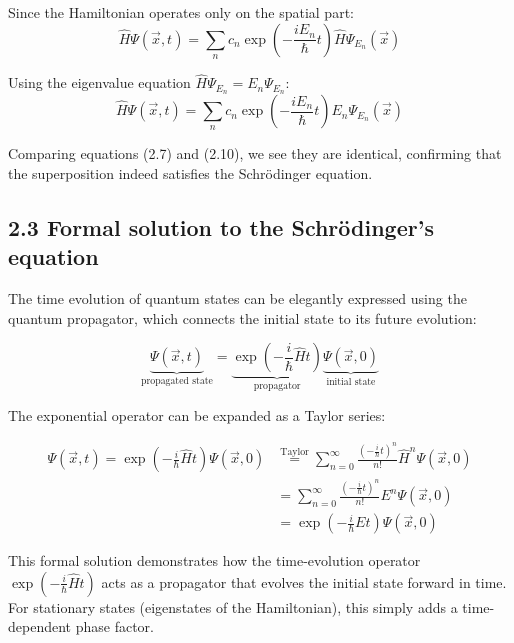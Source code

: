 \documentclass[10pt]{article}
\begin{document}
Since the Hamiltonian operates only on the spatial part:
\begin{equation*}
\hat{H}\Psi(\vec{x},t) = \sum_n c_n\exp\left(-\frac{iE_n}{\hbar}t\right)\hat{H}\Psi_{E_n}(\vec{x}) \tag{2.9}
\end{equation*}

Using the eigenvalue equation $\hat{H}\Psi_{E_n} = E_n\Psi_{E_n}$:
\begin{equation*}
\hat{H}\Psi(\vec{x},t) = \sum_n c_n\exp\left(-\frac{iE_n}{\hbar}t\right)E_n\Psi_{E_n}(\vec{x}) \tag{2.10}
\end{equation*}

Comparing equations (2.7) and (2.10), we see they are identical, confirming that the superposition indeed satisfies the Schrödinger equation.

\subsection*{2.3 Formal solution to the Schrödinger's equation}

The time evolution of quantum states can be elegantly expressed using the quantum propagator, which connects the initial state to its future evolution:

\begin{equation*}
\underbrace{\Psi(\vec{x},t)}_{\text{propagated state}} = \underbrace{\exp\left(-\frac{i}{\hbar}\hat{H}t\right)}_{\text{propagator}}\underbrace{\Psi(\vec{x},0)}_{\text{initial state}} \tag{2.11}
\end{equation*}

The exponential operator can be expanded as a Taylor series:

\begin{align*}
\Psi(\vec{x},t) = \exp\left(-\frac{i}{\hbar}\hat{H}t\right)\Psi(\vec{x},0) &\stackrel{\text{Taylor}}{=} \sum_{n=0}^{\infty}\frac{\left(-\frac{i}{\hbar}t\right)^n}{n!}\hat{H}^n\Psi(\vec{x},0) \\
&= \sum_{n=0}^{\infty}\frac{\left(-\frac{i}{\hbar}t\right)^n}{n!}E^n\Psi(\vec{x},0) \tag{2.12} \\
&= \exp\left(-\frac{i}{\hbar}Et\right)\Psi(\vec{x},0)
\end{align*}

This formal solution demonstrates how the time-evolution operator $\exp\left(-\frac{i}{\hbar}\hat{H}t\right)$ acts as a propagator that evolves the initial state forward in time. For stationary states (eigenstates of the Hamiltonian), this simply adds a time-dependent phase factor.
\end{document}

